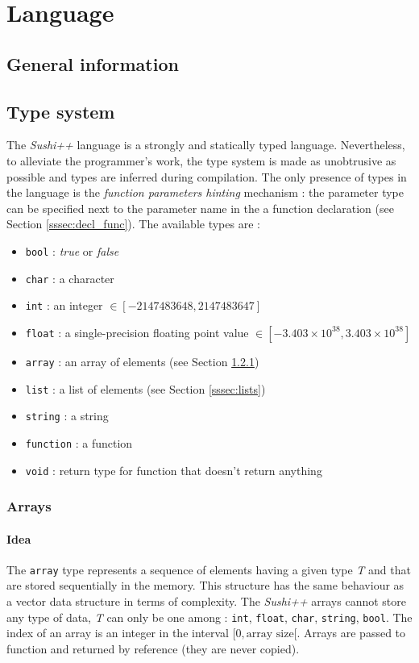 \documentclass[a4paper,11pt]{article}
\begin{document}
\section{Language}
\label{sec:language}
\subsection{General information}
\subsection{Type system}
\label{ssec:types_s}
The \textit{Sushi++} language is a strongly and statically typed language. Nevertheless, to alleviate the programmer's work, the type system is made as unobtrusive as possible and types are inferred during compilation. The only presence of types in the language is the \textit{function parameters hinting} mechanism : the parameter type can be specified next to the parameter name in the a function declaration (see Section \ref{sssec:decl_func}). The available types are :

\begin{itemize}
	\item \texttt{bool} : \textit{true} or \textit{false}
	\item \texttt{char} : a character
	\item \texttt{int} : an integer $\in [-2147483648, 2147483647]$
	\item \texttt{float} : a single-precision floating point value $\in [-3.403 \times 10^{38},  3.403 \times 10^{38}] $
	\item \texttt{array} : an array of elements (see Section \ref{sssec:arrays})
	\item \texttt{list} : a list of elements (see Section \ref{sssec:lists})
	\item \texttt{string} : a string
	\item \texttt{function} : a function
	\item \texttt{void} : return type for function that doesn't return anything
\end{itemize}
\subsubsection{Arrays}
\label{sssec:arrays}
\paragraph{Idea}
The \texttt{array} type represents a sequence of elements having a given type \textit{T} and that are stored sequentially in the memory. This structure has the same behaviour as a vector data structure in terms of complexity. The \textit{Sushi++} arrays cannot store any type of data, \textit{T} can only be one among : \texttt{int}, \texttt{float}, \texttt{char}, \texttt{string}, \texttt{bool}. The index of an array is an integer in the interval $[0, \text{array size}[$. Arrays are passed to function and returned by reference (they are never copied).
\end{document}
